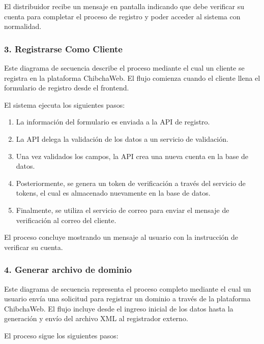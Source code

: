 El distribuidor recibe un mensaje en pantalla indicando que debe verificar su cuenta para completar el proceso de registro y poder acceder al sistema con normalidad.

\subsubsection*{3. Registrarse Como Cliente}

Este diagrama de secuencia describe el proceso mediante el cual un cliente se registra en la plataforma ChibchaWeb. El flujo comienza cuando el cliente llena el formulario de registro desde el frontend.

El sistema ejecuta los siguientes pasos:

\begin{enumerate}
    \item La información del formulario es enviada a la API de registro.
    \item La API delega la validación de los datos a un servicio de validación.
    \item Una vez validados los campos, la API crea una nueva cuenta en la base de datos.
    \item Posteriormente, se genera un token de verificación a través del servicio de tokens, el cual es almacenado nuevamente en la base de datos.
    \item Finalmente, se utiliza el servicio de correo para enviar el mensaje de verificación al correo del cliente.
\end{enumerate}

El proceso concluye mostrando un mensaje al usuario con la instrucción de verificar su cuenta.

\subsubsection*{4. Generar archivo de dominio}

Este diagrama de secuencia representa el proceso completo mediante el cual un usuario envía una solicitud para registrar un dominio a través de la plataforma ChibchaWeb. El flujo incluye desde el ingreso inicial de los datos hasta la generación y envío del archivo XML al registrador externo.

El proceso sigue los siguientes pasos:

